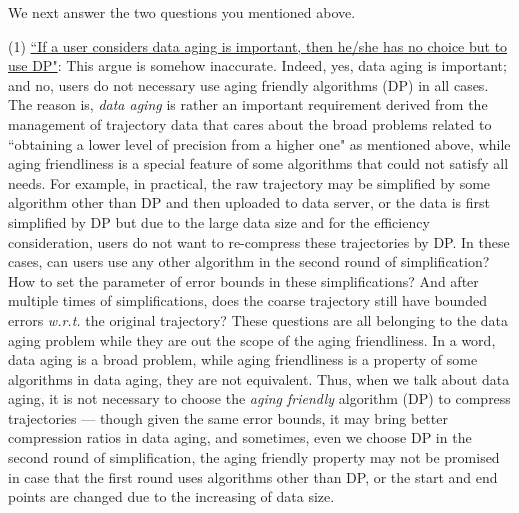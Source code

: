 \documentclass{letter}
\newcommand{\wrt}{\emph{w.r.t.}\xspace}
\begin{document}
{{We next answer the two questions you mentioned above.



(1) \underline{``If a user considers data aging is important, then he/she has no choice but to use DP"}: This argue is somehow inaccurate. Indeed, yes, data aging is important; and no, users do not necessary use aging friendly algorithms (DP) in all cases. The reason is,
\emph{data aging} is rather an important requirement derived from the management of trajectory data that cares about the broad problems related to ``obtaining a lower level of precision from a higher one" as mentioned above, while aging friendliness is a special feature of some algorithms that could not satisfy all needs. For example, in practical, the raw trajectory may be simplified by some algorithm other than DP and then uploaded to data server, or the data is first simplified by DP but due to the large data size and for the efficiency consideration, users do not want to re-compress these trajectories by DP. In these cases, can users use any other algorithm in the second round of simplification? How to set the parameter of error bounds in these simplifications? And after multiple times of simplifications, does the coarse trajectory still have bounded errors \wrt the original trajectory? These questions are all belonging to the data aging problem while they are out the scope of the aging friendliness.
In a word, data aging is a broad problem, while aging friendliness is a property of some algorithms in data aging, they are not equivalent. Thus, when we talk about data aging, it is not necessary to choose the \emph{aging friendly} algorithm (DP) to compress trajectories --- though given the same error bounds, it may bring better compression ratios in data aging, and sometimes, even we choose DP in the second round of simplification, the aging friendly property may not be promised in case that the first round uses algorithms other than DP, or the start and end points are changed due to the increasing of data size.

}}
\end{document}
